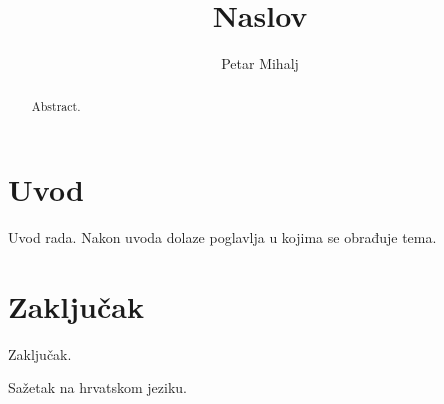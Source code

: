 \documentclass[times, utf8, diplomski]{fer}
\begin{document}

\title{Naslov}

\author{Petar Mihalj}

\maketitle




\tableofcontents

\chapter{Uvod}
Uvod rada. Nakon uvoda dolaze poglavlja u kojima se obrađuje tema.
\citep{ungar2002uvod}

\chapter{Zaključak}
Zaključak.




\begin{sazetak}
Sažetak na hrvatskom jeziku.

\end{sazetak}

\begin{abstract}
Abstract.

\end{abstract}
\end{document}

